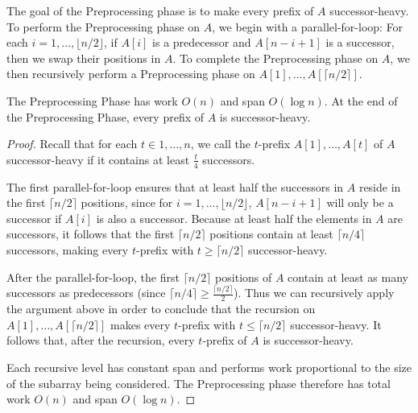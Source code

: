 \documentclass[twoside,leqno,twocolumn]{article}
\renewcommand{\paragraph}[1]{\vspace{0.09in}\noindent{\bf \boldmath #1.}}
\begin{document}
\paragraph{A Preprocessing Phase}
The goal of the Preprocessing phase is to make every prefix of $A$
successor-heavy. To perform the Preprocessing phase on $A$, we begin
with a parallel-for-loop: For each $i = 1, \ldots, \lfloor n /
2\rfloor$, if $A[i]$ is a predecessor and $A[n - i + 1]$ is a
successor, then we swap their positions in $A$. To complete the
Preprocessing phase on $A$, we then recursively perform a
Preprocessing phase on $A[1], \ldots, A[\lceil n / 2 \rceil]$.

\begin{lemma}
 The Preprocessing Phase has work $O(n)$ and span $O(\log n)$. At the
 end of the Preprocessing Phase, every prefix of $A$ is
 successor-heavy.
  \label{lem:preprocessingphase}
\end{lemma}
\begin{proof}
Recall that for each $t \in 1, \ldots, n$, we call the $t$-prefix
$A[1], \ldots, A[t]$ of $A$ successor-heavy if it contains at least
$\frac{t}{4}$ successors.

The first parallel-for-loop ensures that at least half the successors
in $A$ reside in the first $\lceil n / 2 \rceil$ positions, since for
$i = 1, \ldots, \lfloor n / 2 \rfloor$, $A[n - i + 1]$ will only be a
successor if $A[i]$ is also a successor. Because at least half the
elements in $A$ are successors, it follows that the first $\lceil n /
2 \rceil$ positions contain at least $\lceil n / 4\rceil$ successors,
making every $t$-prefix with $t \ge \lceil n / 2 \rceil$
successor-heavy.

After the parallel-for-loop, the first $\lceil n / 2 \rceil$ positions
of $A$ contain at least as many successors as predecessors (since
$\lceil n / 4 \rceil \ge \frac{\lceil n / 2 \rceil}{2}$). Thus we can
recursively apply the argument above in order to conclude that the
recursion on $A[1], \ldots, A[\lceil n / 2 \rceil]$ makes every
$t$-prefix with $t \le \lceil n / 2 \rceil$ successor-heavy. It
follows that, after the recursion, every $t$-prefix of $A$ is
successor-heavy.

Each recursive level has constant span and performs work proportional
to the size of the subarray being considered. The Preprocessing phase
therefore has total work $O(n)$ and span $O(\log n)$.
\end{proof}


\end{document}
